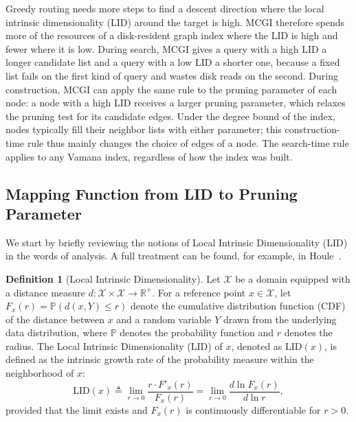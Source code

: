 \documentclass{article}
\theoremstyle{plain}
\theoremstyle{definition}
\newtheorem{definition}[theorem]{Definition}
\theoremstyle{remark}
\newcommand{\ours}{MCGI\xspace}
\begin{document}
Greedy routing needs more steps to find a descent direction where the local intrinsic dimensionality (LID) around the target is high. \ours{} therefore spends more of the resources of a disk-resident graph index where the LID is high and fewer where it is low. During search, \ours{} gives a query with a high LID a longer candidate list and a query with a low LID a shorter one, because a fixed list fails on the first kind of query and wastes disk reads on the second. During construction, \ours{} can apply the same rule to the pruning parameter of each node: a node with a high LID receives a larger pruning parameter, which relaxes the pruning test for its candidate edges. Under the degree bound of the index, nodes typically fill their neighbor lists with either parameter; this construction-time rule thus mainly changes the choice of edges of a node. The search-time rule applies to any Vamana index, regardless of how the index was built.

\subsection{Mapping Function from LID to Pruning Parameter}
\label{subsec:mapping}

We start by briefly reviewing the notions of Local Intrinsic Dimensionality (LID) in the words of analysis. A full treatment can be found, for example, in Houle~\cite{DBLP:conf/sisap/Houle17}.

\begin{definition}[Local Intrinsic Dimensionality]
\label{def:lid}
    Let $\mathcal{X}$ be a domain equipped with a distance measure $d: \mathcal{X} \times \mathcal{X} \to \mathbb{R}^+$. For a reference point $x \in \mathcal{X}$, let $F_x(r) = \mathbb{P}(d(x, Y) \le r)$ denote the cumulative distribution function (CDF) of the distance between $x$ and a random variable $Y$ drawn from the underlying data distribution, where $\mathbb{P}$ denotes the probability function and $r$ denotes the radius. 
    The Local Intrinsic Dimensionality (LID) of $x$, denoted as $\text{LID}(x)$, is defined as the intrinsic growth rate of the probability measure within the neighborhood of $x$:
    \begin{equation}\label{eq:pid}
        \text{LID}(x) \triangleq \lim_{r \to 0} \frac{r \cdot F'_x(r)}{F_x(r)} = \lim_{r \to 0} \frac{d \ln F_x(r)}{d \ln r},
    \end{equation}
    provided that the limit exists and $F_x(r)$ is continuously differentiable for $r > 0$.
\end{definition}
\end{document}
